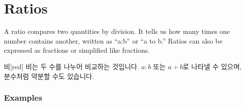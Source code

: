 \documentclass[12pt]{book}
\begin{document}
  
  
  
  
  

  \twosidedpaper
\section{Ratios}

A ratio compares two quantities by division.  
It tells us how many times one number contains another, written as “a:b” or “a to b.”  
Ratios can also be expressed as fractions or simplified like fractions.


\begin{flexbox}{비}[red]
비는 두 수를 나누어 비교하는 것입니다.  
$a:b$ 또는 $a \div b$로 나타낼 수 있으며, 분수처럼 약분할 수도 있습니다.
\end{flexbox}

\subsubsection*{Examples}
\end{document}
